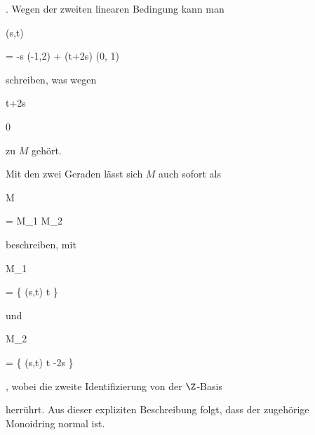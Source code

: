 {{{  }{
}

{    }{
}

{   }{
}

}
{}{}{.}
Wegen der zweiten linearen Bedingung kann man


\mavergleichskettedisp

{\vergleichskette

{ (s,t)
}

{ =} { -s (-1,2) + (t+2s) (0, 1)
}

{ } {
}

{ } {
}

{ } {
}

}
{}{}{}
schreiben, was wegen


\mavergleichskette

{\vergleichskette

{ t+2s
}

{ \geq }{ 0
}

{  }{
}

{    }{
}

{   }{
}

}
{}{}{}
zu $M$ gehört.


Mit den zwei Geraden lässt sich $M$ auch sofort  als


\mavergleichskette

{\vergleichskette

{ M
}

{ = }{ M_1 \cap M_2
}

{  }{
}

{    }{
}

{   }{
}

}
{}{}{}
beschreiben, mit


\mavergleichskette

{\vergleichskette

{ M_1
}

{ = }{ \left\{ (s,t)  \mid  t         \right\}
}

{ \cong }{ \Z \times \N
}

{    }{
}

{   }{
}

}
{}{}{}
und


\mavergleichskette

{\vergleichskette

{ M_2
}

{ = }{ \left\{ (s,t)  \mid  t \geq -2s         \right\}
}

{ \cong }{ \Z \times \N
}

{    }{
}

{   }{
}

}
{}{}{,}
wobei die zweite Identifizierung von der $\Z$-Basis

 herrührt. Aus dieser expliziten Beschreibung folgt, dass der zugehörige Monoidring normal ist.


}



